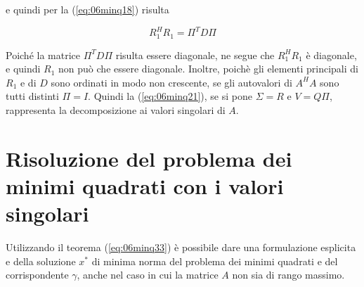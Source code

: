 e quindi per la  (\ref{eq:06minq18}) risulta

$$R_1^{H} R_1 = \Pi^T D\Pi$$

Poich\'e la matrice $\Pi^T D\Pi$ risulta essere diagonale, ne segue che $R_1^{H} R_1$ 
\`e  diagonale, e quindi $R_1$ non pu\`o che essere diagonale.
 Inoltre, poich\`e gli  
 elementi principali di $R_1$ e di $D$ sono ordinati in modo non 
crescente, se gli  autovalori di $A^H A$ sono tutti distinti 
$ \Pi = I$. Quindi la (\ref{eq:06minq21}), se si pone
$ \Sigma = R$ e $V = Q\Pi$, rappresenta la decomposizione ai valori
 singolari di $A$.

\section{Risoluzione del problema dei minimi quadrati con i valori singolari}
Utilizzando il teorema (\ref{eq:06minq33}) \`e possibile dare una
formulazione esplicita e della soluzione $x^*$ di minima norma del
problema dei minimi quadrati e del corrispondente $\gamma$, anche nel
caso in cui la matrice $A$ non sia di rango massimo.

